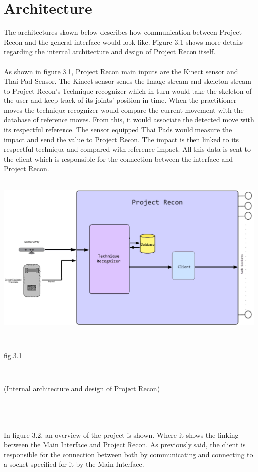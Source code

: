 \documentclass[11pt]{article} %
\begin{document}
\section{Architecture}
The architectures shown below describes how communication between Project Recon and the general interface would look like. Figure 3.1 shows more details regarding the internal architecture and design of Project Recon itself.
\\
\\
As shown in figure 3.1, Project Recon main inputs are the Kinect sensor and Thai Pad Sensor. The Kinect sensor sends the Image stream and skeleton stream to Project Recon's Technique recognizer which in turn would take the skeleton of the user and keep track of its joints' position in time. When the practitioner moves the technique recognizer would compare the current movement with the database of reference moves. From this, it would associate the detected move with its respectful reference. The sensor equipped Thai Pads would measure the impact and send the value to Project Recon. The impact is then linked to its respectful technique and compared with reference impact. All this data is sent to the client which is responsible for the connection between the interface and Project Recon.
\\
\\
\centerline{\includegraphics[scale=0.4]{project_Recon_diagram.png}}
\\
\centerline{fig.3.1}
\\
\centerline{(Internal architecture and design of Project Recon)}
\\
\\
\\
In figure 3.2, an overview of the project is shown. Where it shows the linking between the Main Interface and Project Recon. As previously said, the client is responsible for the connection between both by communicating and connecting to a socket specified for it by the Main Interface.
\end{document}
